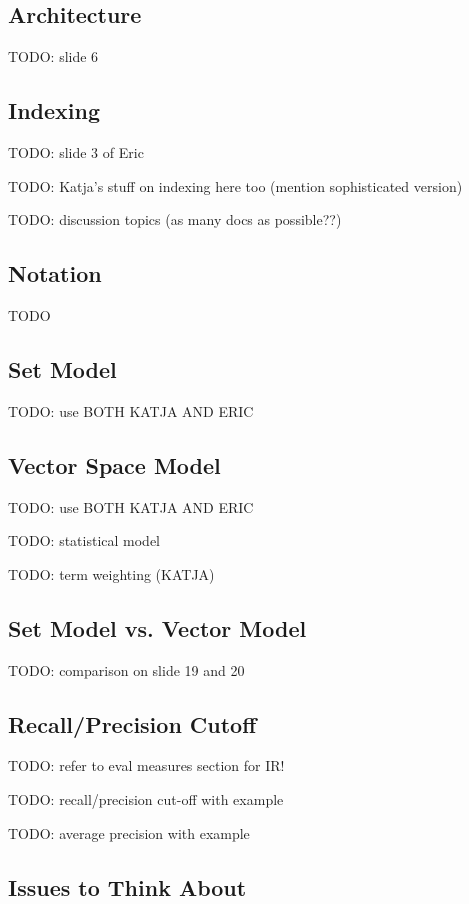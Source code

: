 \documentclass{article}
\begin{document}
\subsection{Architecture}

TODO: slide 6

\subsection{Indexing}

TODO: slide 3 of Eric

TODO: Katja's stuff on indexing here too (mention sophisticated version)

TODO: discussion topics (as many docs as possible??)

\subsection{Notation}

TODO

\subsection{Set Model}

TODO: use BOTH KATJA AND ERIC

\subsection{Vector Space Model}

TODO: use BOTH KATJA AND ERIC

TODO: statistical model

TODO: term weighting (KATJA)

\subsection{Set Model vs. Vector Model}

TODO: comparison on slide 19 and 20

\subsection{Recall/Precision Cutoff}

TODO: refer to eval measures section for IR!

TODO: recall/precision cut-off with example

TODO: average precision with example

\subsection{Issues to Think About}
\end{document}
